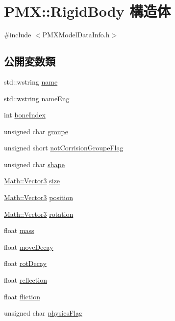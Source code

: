 \hypertarget{struct_p_m_x_1_1_rigid_body}{}\section{P\+MX\+:\+:Rigid\+Body 構造体}
\label{struct_p_m_x_1_1_rigid_body}


{\ttfamily \#include $<$P\+M\+X\+Model\+Data\+Info.\+h$>$}

\subsection*{公開変数類}
\begin{DoxyCompactItemize}
\item 
std\+::wstring \mbox{\hyperlink{struct_p_m_x_1_1_rigid_body_a3de9ba10fdef0194ebf217e5621493c3}{name}}
\item 
std\+::wstring \mbox{\hyperlink{struct_p_m_x_1_1_rigid_body_a05909a51dca7b59d99a2b3a5021b3906}{name\+Eng}}
\item 
int \mbox{\hyperlink{struct_p_m_x_1_1_rigid_body_a4571710c2939348af9ff8e2f53fb1b8a}{bone\+Index}}
\item 
unsigned char \mbox{\hyperlink{struct_p_m_x_1_1_rigid_body_a1ee97437840c249b14916a5378f369aa}{groupe}}
\item 
unsigned short \mbox{\hyperlink{struct_p_m_x_1_1_rigid_body_aa0d8db3502f089aedbc5d6c8d35ece19}{not\+Corrision\+Groupe\+Flag}}
\item 
unsigned char \mbox{\hyperlink{struct_p_m_x_1_1_rigid_body_a1409fb79115f05b74aa4532fef6afd80}{shape}}
\item 
\mbox{\hyperlink{struct_math_1_1_vector3}{Math\+::\+Vector3}} \mbox{\hyperlink{struct_p_m_x_1_1_rigid_body_a0943be3e25ea7870cdb340b08846e5ad}{size}}
\item 
\mbox{\hyperlink{struct_math_1_1_vector3}{Math\+::\+Vector3}} \mbox{\hyperlink{struct_p_m_x_1_1_rigid_body_a4e4c674317304a02d7c1a6c4b047155a}{position}}
\item 
\mbox{\hyperlink{struct_math_1_1_vector3}{Math\+::\+Vector3}} \mbox{\hyperlink{struct_p_m_x_1_1_rigid_body_af1205bf2983ab2c59f5731382ff22cb0}{rotation}}
\item 
float \mbox{\hyperlink{struct_p_m_x_1_1_rigid_body_affab4f40023f96f4a4966752f7e26baa}{mass}}
\item 
float \mbox{\hyperlink{struct_p_m_x_1_1_rigid_body_acb1d07ad62ea637ed34b99b146f7991e}{move\+Decay}}
\item 
float \mbox{\hyperlink{struct_p_m_x_1_1_rigid_body_ae908f0f203a330b0ef78d1b328d810fd}{rot\+Decay}}
\item 
float \mbox{\hyperlink{struct_p_m_x_1_1_rigid_body_a53e1f665527665ef8a2d3484d73e7583}{reflection}}
\item 
float \mbox{\hyperlink{struct_p_m_x_1_1_rigid_body_ac95f079485a900d3e29226b23f7b017e}{fliction}}
\item 
unsigned char \mbox{\hyperlink{struct_p_m_x_1_1_rigid_body_a4bf2623da47072dcc17cfa16dc6d5e39}{physics\+Flag}}
\end{DoxyCompactItemize}


